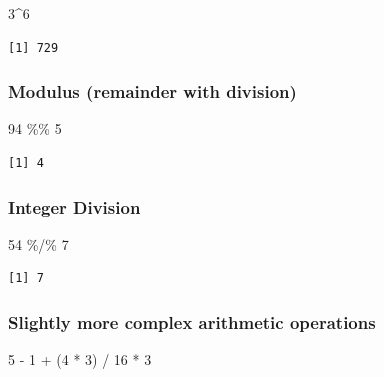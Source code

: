 \documentclass[
  letterpaper,
  DIV=11,
  numbers=noendperiod]{scrreprt}
\newenvironment{Shaded}{\begin{snugshade}}{\end{snugshade}}
\newcommand{\DecValTok}[1]{\textcolor[rgb]{0.68,0.00,0.00}{#1}}
\newcommand{\NormalTok}[1]{\textcolor[rgb]{0.00,0.23,0.31}{#1}}
\newcommand{\SpecialCharTok}[1]{\textcolor[rgb]{0.37,0.37,0.37}{#1}}
\begin{document}
\begin{Shaded}
\begin{Highlighting}[]
\DecValTok{3}\SpecialCharTok{\^{}}\DecValTok{6}
\end{Highlighting}
\end{Shaded}

\begin{verbatim}
[1] 729
\end{verbatim}

\subsubsection{Modulus (remainder with
division)}\label{modulus-remainder-with-division}

\begin{Shaded}
\begin{Highlighting}[]
\DecValTok{94} \SpecialCharTok{\%\%} \DecValTok{5}
\end{Highlighting}
\end{Shaded}

\begin{verbatim}
[1] 4
\end{verbatim}

\subsubsection{Integer Division}\label{integer-division}

\begin{Shaded}
\begin{Highlighting}[]
\DecValTok{54} \SpecialCharTok{\%/\%} \DecValTok{7}
\end{Highlighting}
\end{Shaded}

\begin{verbatim}
[1] 7
\end{verbatim}

\subsubsection{Slightly more complex arithmetic
operations}\label{slightly-more-complex-arithmetic-operations}

\begin{Shaded}
\begin{Highlighting}[]
\DecValTok{5} \SpecialCharTok{{-}} \DecValTok{1} \SpecialCharTok{+}\NormalTok{ (}\DecValTok{4} \SpecialCharTok{*} \DecValTok{3}\NormalTok{) }\SpecialCharTok{/} \DecValTok{16} \SpecialCharTok{*} \DecValTok{3}
\end{Highlighting}
\end{Shaded}
\end{document}
